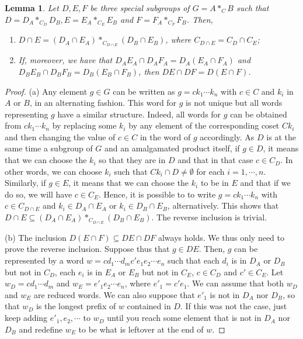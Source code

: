 \documentclass[11pt,letterpaper]{amsart}
\newtheorem{lemma}[prop]{Lemma}
\begin{document}
\begin{lemma}\label{lem:freeIntersectionAmalgam}
    Let $D,E,F$ be three special subgroups of $G = A *_C B$ such that $D = D_A *_{C_D} D_B, E = E_A *_{C_E} E_B$ and $F = F_A *_{C_F} F_B$. Then,
    \begin{enumerate}
        \item $D \cap E = (D_A \cap E_A) *_{C_{D\cap E}} (D_B \cap E_B)$, where $C_{D\cap E}=C_D\cap C_E$;
        \item If, moreover, we have that $D_A E_A \cap D_A F_A = D_A(E_A \cap F_A)$ and $D_B E_B \cap D_B F_B = D_B(E_B \cap F_B)$, then $DE \cap DF = D(E \cap F)$.
    \end{enumerate}
\end{lemma}
\begin{proof}

    (a)  Any element $g \in G$ can be written as $g = c k_1 \cdots k_n$ with $c \in C$ and $k_i$ in $A$ or $B$, in an alternating fashion. This word for $g$ is not unique but all words representing $g$ have a similar structure. Indeed, all words for $g$ can be obtained from $ck_1 \cdots k_n$ by replacing some $k_i$ by any element of the corresponding coset $C k_i$ and then changing the value of $c \in C$ in the word of $g$ accordingly.
    As $D$ is at the same time a subgroup of $G$ and an amalgamated product itself, if $g \in D$, it means that we can choose the $k_i$ so that they are in $D$ and that in that case $c \in C_D$. 
    In other words, we can choose $k_i$ such that $C k_i \cap D \neq \emptyset$ for each $i = 1, \cdots, n$. Similarly, if $g \in E$, it means that we can choose the $k_i$ to be in $E$ and that if we do so, we will have $c \in C_E$. Hence, it is possible to to write $g = c k_1 \cdots k_n$ with $c \in C_{D \cap E}$ and $k_i \in D_A \cap E_A$ or $k_i \in D_B \cap E_B$, alternatively. This shows that $D \cap E \subseteq (D_A \cap E_A) *_{C_{D\cap E}} (D_B \cap E_B)$. The reverse inclusion is trivial.
   
    
(b) The inclusion $D(E \cap F) \subseteq DE \cap DF$ always holds. We thus only need to prove the reverse inclusion. Suppose thus that $g \in DE$. Then, $g$ can be represented by a word $w = cd_1 \cdots d_m c'e_{1}e_2 \cdots e_n$ such that each $d_i$ is in $D_A$ or $D_B$ but not in $C_D$, each $e_i$ is in $E_A$ or $E_B$ but not in $C_E$, $c\in C_D$ and $c'\in C_E$. Let $w_D = cd_1 \cdots d_m$ and $w_E = e'_{1}e_2 \cdots e_n$, where $e'_1=c'e_1$. We can assume that both $w_D$ and $w_E$ are reduced words. We can also suppose that $e'_1$ is not in $D_A$ nor $D_B$, so that 
$w_D$ is the longest prefix of $w$ contained in $D$. If this was not the case, just keep adding $e'_1, e_2, \cdots$ to $w_D$ until you reach some element that is not in $D_A$ nor $D_B$ and redefine $w_E$ to be what is leftover at the end of $w$.


\end{proof}
\end{document}
